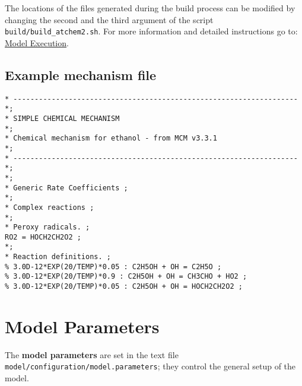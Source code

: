 The locations of the files generated during the build process can be
modified by changing the second and the third argument of the script
\texttt{build/build\_atchem2.sh}. For more information and detailed
instructions go to: \hyperref[ch:execution]{Model Execution}.

\subsection{Example mechanism file} \label{subsec:example-mechanism-file}

\begin{verbatim}
* ------------------------------------------------------------------- *;
* SIMPLE CHEMICAL MECHANISM                                           *;
* Chemical mechanism for ethanol - from MCM v3.3.1                    *;
* ------------------------------------------------------------------- *;
*;
* Generic Rate Coefficients ;
*;
* Complex reactions ;
*;
* Peroxy radicals. ;
RO2 = HOCH2CH2O2 ;
*;
* Reaction definitions. ;
% 3.0D-12*EXP(20/TEMP)*0.05 : C2H5OH + OH = C2H5O ;
% 3.0D-12*EXP(20/TEMP)*0.9 : C2H5OH + OH = CH3CHO + HO2 ;
% 3.0D-12*EXP(20/TEMP)*0.05 : C2H5OH + OH = HOCH2CH2O2 ;
\end{verbatim}

\section{Model Parameters} \label{sec:model-parameters}

The \textbf{model parameters} are set in the text file
\texttt{model/configuration/model.parameters}; they control the
general setup of the model.

